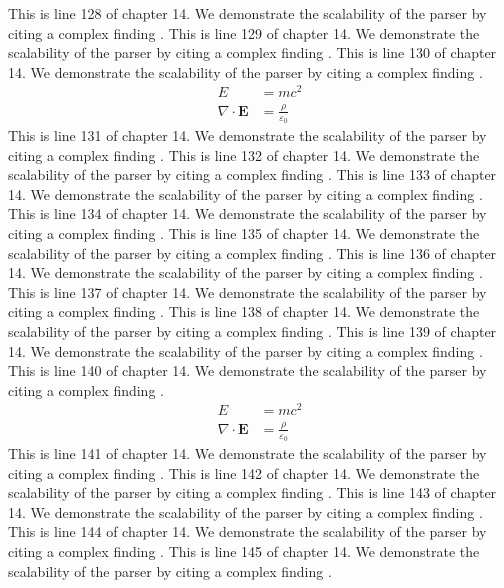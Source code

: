 This is line 128 of chapter 14. We demonstrate the scalability of the parser by citing a complex finding \cite{ref14_128}.
This is line 129 of chapter 14. We demonstrate the scalability of the parser by citing a complex finding \cite{ref14_129}.
This is line 130 of chapter 14. We demonstrate the scalability of the parser by citing a complex finding \cite{ref14_130}.
\begin{align*}
  E &= mc^2 \\
  \nabla \cdot \mathbf{E} &= \frac{\rho}{\varepsilon_0}
\end{align*}
This is line 131 of chapter 14. We demonstrate the scalability of the parser by citing a complex finding \cite{ref14_131}.
This is line 132 of chapter 14. We demonstrate the scalability of the parser by citing a complex finding \cite{ref14_132}.
This is line 133 of chapter 14. We demonstrate the scalability of the parser by citing a complex finding \cite{ref14_133}.
This is line 134 of chapter 14. We demonstrate the scalability of the parser by citing a complex finding \cite{ref14_134}.
This is line 135 of chapter 14. We demonstrate the scalability of the parser by citing a complex finding \cite{ref14_135}.
This is line 136 of chapter 14. We demonstrate the scalability of the parser by citing a complex finding \cite{ref14_136}.
This is line 137 of chapter 14. We demonstrate the scalability of the parser by citing a complex finding \cite{ref14_137}.
This is line 138 of chapter 14. We demonstrate the scalability of the parser by citing a complex finding \cite{ref14_138}.
This is line 139 of chapter 14. We demonstrate the scalability of the parser by citing a complex finding \cite{ref14_139}.
This is line 140 of chapter 14. We demonstrate the scalability of the parser by citing a complex finding \cite{ref14_140}.
\begin{align*}
  E &= mc^2 \\
  \nabla \cdot \mathbf{E} &= \frac{\rho}{\varepsilon_0}
\end{align*}
This is line 141 of chapter 14. We demonstrate the scalability of the parser by citing a complex finding \cite{ref14_141}.
This is line 142 of chapter 14. We demonstrate the scalability of the parser by citing a complex finding \cite{ref14_142}.
This is line 143 of chapter 14. We demonstrate the scalability of the parser by citing a complex finding \cite{ref14_143}.
This is line 144 of chapter 14. We demonstrate the scalability of the parser by citing a complex finding \cite{ref14_144}.
This is line 145 of chapter 14. We demonstrate the scalability of the parser by citing a complex finding \cite{ref14_145}.
